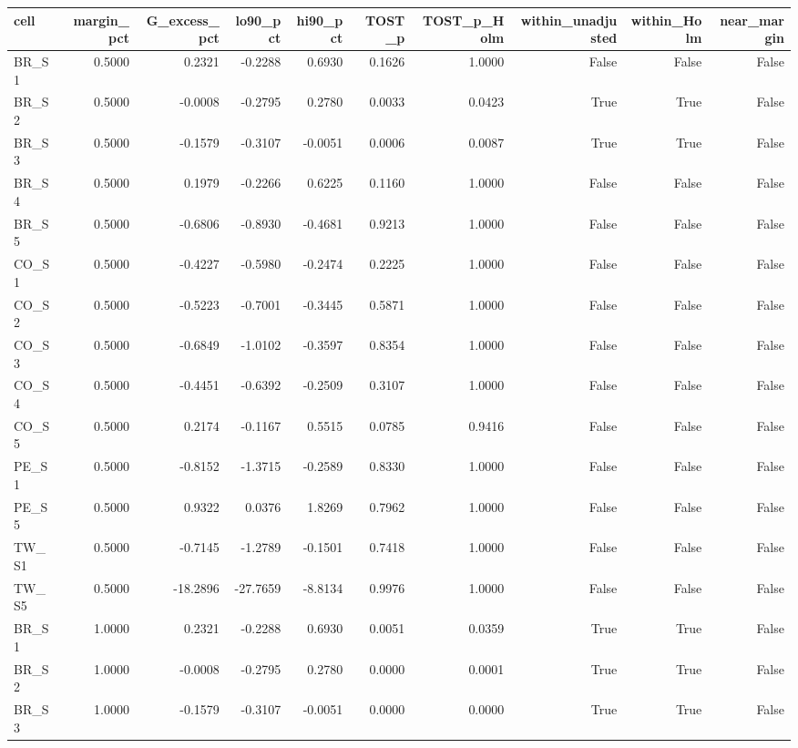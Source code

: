 \begin{tabular}{lrrrrrrrrr}
\toprule
cell & margin\_pct & G\_excess\_pct & lo90\_pct & hi90\_pct & TOST\_p & TOST\_p\_Holm & within\_unadjusted & within\_Holm & near\_margin \\
\midrule
BR\_S1 & 0.5000 & 0.2321 & -0.2288 & 0.6930 & 0.1626 & 1.0000 & False & False & False \\
BR\_S2 & 0.5000 & -0.0008 & -0.2795 & 0.2780 & 0.0033 & 0.0423 & True & True & False \\
BR\_S3 & 0.5000 & -0.1579 & -0.3107 & -0.0051 & 0.0006 & 0.0087 & True & True & False \\
BR\_S4 & 0.5000 & 0.1979 & -0.2266 & 0.6225 & 0.1160 & 1.0000 & False & False & False \\
BR\_S5 & 0.5000 & -0.6806 & -0.8930 & -0.4681 & 0.9213 & 1.0000 & False & False & False \\
CO\_S1 & 0.5000 & -0.4227 & -0.5980 & -0.2474 & 0.2225 & 1.0000 & False & False & False \\
CO\_S2 & 0.5000 & -0.5223 & -0.7001 & -0.3445 & 0.5871 & 1.0000 & False & False & False \\
CO\_S3 & 0.5000 & -0.6849 & -1.0102 & -0.3597 & 0.8354 & 1.0000 & False & False & False \\
CO\_S4 & 0.5000 & -0.4451 & -0.6392 & -0.2509 & 0.3107 & 1.0000 & False & False & False \\
CO\_S5 & 0.5000 & 0.2174 & -0.1167 & 0.5515 & 0.0785 & 0.9416 & False & False & False \\
PE\_S1 & 0.5000 & -0.8152 & -1.3715 & -0.2589 & 0.8330 & 1.0000 & False & False & False \\
PE\_S5 & 0.5000 & 0.9322 & 0.0376 & 1.8269 & 0.7962 & 1.0000 & False & False & False \\
TW\_S1 & 0.5000 & -0.7145 & -1.2789 & -0.1501 & 0.7418 & 1.0000 & False & False & False \\
TW\_S5 & 0.5000 & -18.2896 & -27.7659 & -8.8134 & 0.9976 & 1.0000 & False & False & False \\
BR\_S1 & 1.0000 & 0.2321 & -0.2288 & 0.6930 & 0.0051 & 0.0359 & True & True & False \\
BR\_S2 & 1.0000 & -0.0008 & -0.2795 & 0.2780 & 0.0000 & 0.0001 & True & True & False \\
BR\_S3 & 1.0000 & -0.1579 & -0.3107 & -0.0051 & 0.0000 & 0.0000 & True & True & False \\

\end{tabular}
